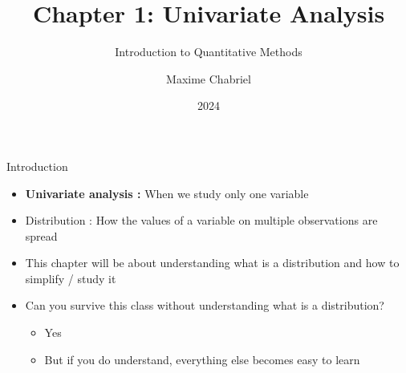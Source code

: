 \documentclass[compress]{beamer}
\title{Chapter 1: Univariate Analysis}
\subtitle{Introduction to Quantitative Methods}
\author{Maxime Chabriel}
\date{2024}
\begin{document}
\maketitle

\begin{frame}{Introduction}
    \begin{itemize}
        \item \textbf{Univariate analysis :} When we study only one variable \\
        \vspace{0.2cm}
        \item Distribution : How the values of a variable on multiple observations are spread
        \vspace{0.2cm}
        \item This chapter will be about understanding what is a distribution and how to simplify / study it 
        \vspace{0.2cm}
		\item Can you survive this class without understanding what is a distribution?
		\begin{itemize}
			\item Yes
			\item But if you do understand, everything else becomes easy to learn
		\end{itemize}
    \end{itemize}
\end{frame}
\end{document}

